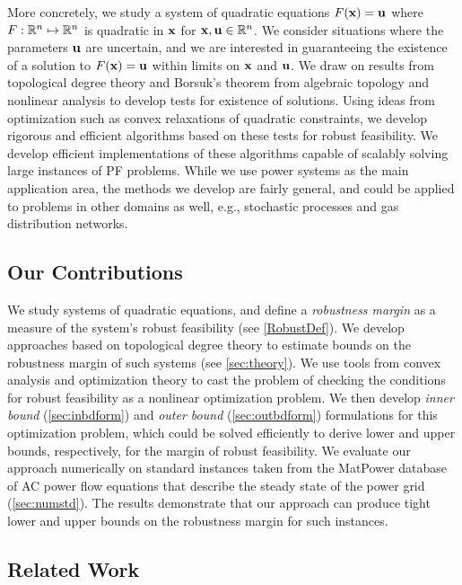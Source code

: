 \medskip
More concretely, we study a system of quadratic equations $F(\mathbf{x})=\mathbf{u}$ where $F: \mathbb{R}^n \mapsto \mathbb{R}^n$ is quadratic in $\mathbf{x}$ for $\mathbf{x},\mathbf{u} \in \mathbb{R}^n$.
  We consider situations where the parameters $\mathbf{u}$ are uncertain, and we are interested in guaranteeing the existence of a solution to $F(\mathbf{x}) = \mathbf{u}$ within limits on $\mathbf{x}$ and $\mathbf{u}$.
We draw on results from topological degree theory and Borsuk's theorem from algebraic topology and nonlinear analysis to develop tests for existence of solutions.
Using ideas from optimization such as convex relaxations of quadratic constraints, we develop rigorous and efficient algorithms based on these tests for robust feasibility.
We develop efficient implementations of these algorithms capable of scalably solving large instances of PF problems.
While we use power systems as the main application area, the methods we develop are fairly general, and could be applied to problems in other domains as well, e.g., stochastic processes and gas distribution networks.

\subsection{Our Contributions}
  We study systems of quadratic equations, and define a \emph{robustness margin} as a measure of the system's robust feasibility (see \cref{RobustDef}).
  We develop approaches based on topological degree theory to estimate bounds on the robustness margin of such systems (see \cref{sec:theory}).
  We use tools from convex analysis and optimization theory to cast the problem of checking the conditions for robust feasibility as a nonlinear optimization problem.
  We then develop \emph{inner bound} (\cref{sec:inbdform}) and \emph{outer bound} (\cref{sec:outbdform}) formulations for this optimization problem, which could be solved efficiently to derive lower and upper bounds, respectively, for the margin of robust feasibility.
  We evaluate our approach numerically on standard instances taken from the MatPower database of AC power flow equations that describe the steady state of the power grid (\cref{sec:numstd}).
  The results demonstrate that our approach can produce tight lower and upper bounds on the robustness margin for such instances.

\subsection{Related Work}

